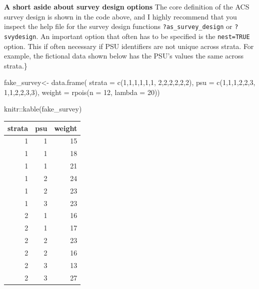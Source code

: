 \documentclass[
]{article}
\newenvironment{Shaded}{\begin{snugshade}}{\end{snugshade}}
\newcommand{\AttributeTok}[1]{\textcolor[rgb]{0.77,0.63,0.00}{#1}}
\newcommand{\DecValTok}[1]{\textcolor[rgb]{0.00,0.00,0.81}{#1}}
\newcommand{\FunctionTok}[1]{\textcolor[rgb]{0.00,0.00,0.00}{#1}}
\newcommand{\NormalTok}[1]{#1}
\newcommand{\OtherTok}[1]{\textcolor[rgb]{0.56,0.35,0.01}{#1}}
\newcommand{\SpecialCharTok}[1]{\textcolor[rgb]{0.00,0.00,0.00}{#1}}
\begin{document}
\textbf{A short aside about survey design options}
The core definition of the ACS survey design is shown in the code above, and I highly recommend that you inspect the help file for the survey design functions \texttt{?as\_survey\_design} or \texttt{?svydesign}. An important option that often has to be specified is the \texttt{nest=TRUE} option. This if often necessary if PSU identifiers are not unique across strata. For example, the fictional data shown below has the PSU's values the same across strata.\}

\begin{Shaded}
\begin{Highlighting}[]
\NormalTok{fake\_survey}\OtherTok{\textless{}{-}} \FunctionTok{data.frame}\NormalTok{(}
  \AttributeTok{strata =} \FunctionTok{c}\NormalTok{(}\DecValTok{1}\NormalTok{,}\DecValTok{1}\NormalTok{,}\DecValTok{1}\NormalTok{,}\DecValTok{1}\NormalTok{,}\DecValTok{1}\NormalTok{,}\DecValTok{1}\NormalTok{,}
             \DecValTok{2}\NormalTok{,}\DecValTok{2}\NormalTok{,}\DecValTok{2}\NormalTok{,}\DecValTok{2}\NormalTok{,}\DecValTok{2}\NormalTok{,}\DecValTok{2}\NormalTok{),}
  \AttributeTok{psu =} \FunctionTok{c}\NormalTok{(}\DecValTok{1}\NormalTok{,}\DecValTok{1}\NormalTok{,}\DecValTok{1}\NormalTok{,}\DecValTok{2}\NormalTok{,}\DecValTok{2}\NormalTok{,}\DecValTok{3}\NormalTok{,}
          \DecValTok{1}\NormalTok{,}\DecValTok{1}\NormalTok{,}\DecValTok{2}\NormalTok{,}\DecValTok{2}\NormalTok{,}\DecValTok{3}\NormalTok{,}\DecValTok{3}\NormalTok{),}
  \AttributeTok{weight =} \FunctionTok{rpois}\NormalTok{(}\AttributeTok{n =} \DecValTok{12}\NormalTok{, }\AttributeTok{lambda =} \DecValTok{20}\NormalTok{))}

\NormalTok{knitr}\SpecialCharTok{::}\FunctionTok{kable}\NormalTok{(fake\_survey)}
\end{Highlighting}
\end{Shaded}

\begin{tabular}{r|r|r}
\hline
strata & psu & weight\\
\hline
1 & 1 & 15\\
\hline
1 & 1 & 18\\
\hline
1 & 1 & 21\\
\hline
1 & 2 & 24\\
\hline
1 & 2 & 23\\
\hline
1 & 3 & 23\\
\hline
2 & 1 & 16\\
\hline
2 & 1 & 17\\
\hline
2 & 2 & 23\\
\hline
2 & 2 & 16\\
\hline
2 & 3 & 13\\
\hline
2 & 3 & 27\\
\hline
\end{tabular}
\end{document}
